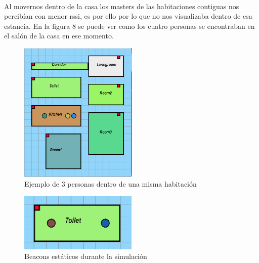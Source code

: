 \documentclass[paper=a4, fontsize=11pt,twoside]{scrartcl}
\begin{document}
            \paragraph{}
            Al movernos dentro de la casa los masters de las habitaciones contiguas nos percibían con menor rssi, es por
            ello por lo que no nos visualizaba dentro de esa estancia. En la figura 8 se puede ver como los cuatro personas se 
            encontraban en el salón de la casa en ese momento.
            \begin{center}
                \begin{figure}[]
                    \centering
                    \includegraphics[width=0.5\textwidth]{../../Memmory/images/house_simulation_1.PNG}
                    \caption{Ejemplo de 3 personas dentro de una misma habitación}
                    \label{fig:mesh17}
                \end{figure}
            \end{center}          
            \begin{center}
                \begin{figure}[]
                    \centering
                    \includegraphics[width=0.5\textwidth]{../../Memmory/images/house_simulation_2.PNG}
                    \caption{Beacons estáticos durante la simulación}
                    \label{fig:mesh19}
                \end{figure}
            \end{center} 
\end{document}
